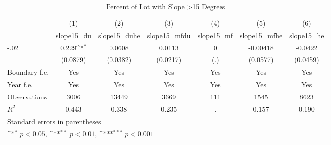 \begin{table}[htbp]\centering
\def\sym#1{\ifmmode^{#1}\else\(^{#1}\)\fi}
\caption{Percent of Lot with Slope >15 Degrees}
\begin{tabular}{l*{6}{c}}
\hline\hline
                    &\multicolumn{1}{c}{(1)}&\multicolumn{1}{c}{(2)}&\multicolumn{1}{c}{(3)}&\multicolumn{1}{c}{(4)}&\multicolumn{1}{c}{(5)}&\multicolumn{1}{c}{(6)}\\
                    &\multicolumn{1}{c}{slope15\_du}&\multicolumn{1}{c}{slope15\_duhe}&\multicolumn{1}{c}{slope15\_mfdu}&\multicolumn{1}{c}{slope15\_mf}&\multicolumn{1}{c}{slope15\_mfhe}&\multicolumn{1}{c}{slope15\_he}\\
\hline
-.02                &       0.229\sym{*}  &      0.0608         &      0.0113         &           0         &    -0.00418         &     -0.0422         \\
                    &    (0.0879)         &    (0.0382)         &    (0.0217)         &         (.)         &    (0.0577)         &    (0.0459)         \\
[1em]
Boundary f.e.       &         Yes         &         Yes         &         Yes         &         Yes         &         Yes         &         Yes         \\
[1em]
Year f.e.           &         Yes         &         Yes         &         Yes         &         Yes         &         Yes         &         Yes         \\
\hline
Observations        &        3006         &       13449         &        3669         &         111         &        1545         &        8623         \\
\(R^{2}\)           &       0.443         &       0.338         &       0.235         &           .         &       0.157         &       0.190         \\
\hline\hline
\multicolumn{7}{l}{\footnotesize Standard errors in parentheses}\\
\multicolumn{7}{l}{\footnotesize \sym{*} \(p<0.05\), \sym{**} \(p<0.01\), \sym{***} \(p<0.001\)}\\
\end{tabular}
\end{table}
